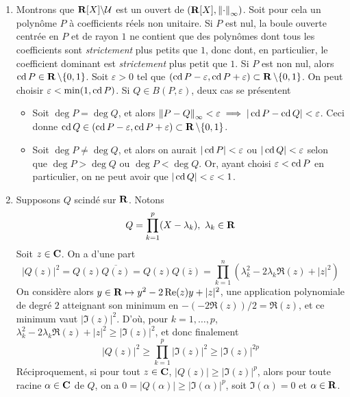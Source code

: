 \begin{correction}\hfill
    \begin{enumerate}
        \item Montrons que $\operatorname{\mathbf{R}}[X]\backslash\mathcal U$ est un ouvert de $(\operatorname{\mathbf{R}}[X],\left\lVert \cdot\right\rVert_\infty)$. 
        Soit pour cela un polynôme $P$ à coefficients réels non unitaire. 
        Si $P$ est nul, la boule ouverte centrée en $P$ et de rayon $1$ ne contient 
        que des polynômes dont tous les coefficients sont \textit{strictement} plus petits que $1$,
        donc dont, en particulier, le coefficient dominant est \textit{strictement} plus petit que $1$.
        Si $P$ est non nul, alors $\operatorname{cd} P\in \operatorname{\mathbf{R}}\backslash\lbrace 0,1\rbrace$. 
        Soit $\varepsilon > 0$ tel que $(\operatorname{cd} P-\varepsilon,\operatorname{cd} P+\varepsilon)\subset\operatorname{\mathbf{R}}\backslash\lbrace0,1\rbrace$. 
        On peut choisir $\varepsilon < \min(1,\operatorname{cd} P)$. 
        Si $Q\in B(P,\varepsilon)$, deux cas se présentent 
        \begin{itemize}
            \item Soit $\deg P=\deg Q$, et alors $\left\lVert P-Q\right\rVert_\infty<\varepsilon\implies|\operatorname{cd} P-\operatorname{cd} Q|<\varepsilon$. 
            Ceci donne $\operatorname{cd} Q\in(\operatorname{cd} P-\varepsilon,\operatorname{cd} P+\varepsilon)\subset\operatorname{\mathbf{R}}\backslash\lbrace0,1\rbrace$.
            \item Soit $\deg P\neq\deg Q$, et alors on aurait $|\operatorname{cd} P|<\varepsilon$ ou $|\operatorname{cd} Q|<\varepsilon$ selon que $\deg P>\deg Q$ ou $\deg P<\deg Q$.
            Or, ayant choisi $\varepsilon < \operatorname{cd} P$ en particulier, on ne peut avoir que $|\operatorname{cd} Q|<\varepsilon<1$.
        \end{itemize}
        \item Supposons $Q$ scindé sur $\operatorname{\mathbf{R}}$. 
        Notons 
        \[
            Q=\prod_{k=1}^p(X-\lambda_k),\ \lambda_k\in\R  
        \]
        Soit $z\in\operatorname{\mathbf{C}}$. 
        On a d'une part 
        \[
            |Q(z)|^2=Q(z)\overline{Q(z)}=Q(z)Q(\overline z)=\prod_{k=1}^n(\lambda_k^2-2\lambda_k\Re(z)+|z|^2)    
        \]
        On considère alors $y\in\operatorname{\mathbf{R}}\mapsto y^2-2\operatorname{Re}(z)y+|z|^2$, une application polynomiale de degré $2$ atteignant son minimum 
        en $-(-2\Re(z))/2=\Re(z)$, et ce minimum vaut $|\Im(z)|^2$.
        D'où, pour $k=1,\dots,p$, $\lambda_k^2-2\lambda_k\Re(z)+|z|^2\geq |\Im(z)|^2$, et donc finalement 
        \[
            |Q(z)|^2\geq\prod_{k=1}^p|\Im(z)|^2\geq|\Im(z)|^{2p}
        \]
        Réciproquement, si pour tout $z\in \operatorname{\mathbf{C}}$, $|Q(z)|\geq|\Im(z)|^p$, alors pour toute racine $\alpha\in\operatorname{\mathbf{C}}$ de $Q$,
        on a $0=|Q(\alpha)|\geq|\Im(\alpha)|^p$, soit $\Im(\alpha)=0$ et $\alpha\in\operatorname{\mathbf{R}}$.


\end{enumerate}
\end{correction}
